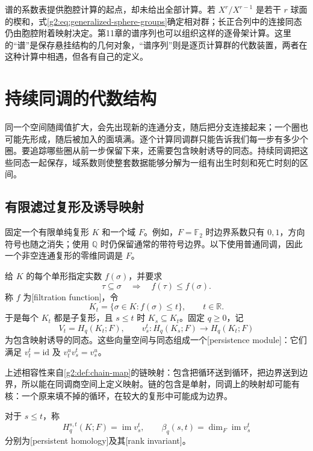 \ProseParagraphBreak

谱的系数表提供胞腔计算的起点，却未给出全部计算。若 \(X^r/X^{r-1}\) 是若干 \(r\) 球面的楔和，式\eqref{g2:eq:generalized-sphere-groups}确定相对群；长正合列中的连接同态仍由胞腔附着映射决定。第11章的谱序列也可以组织这样的逐骨架计算。这里的“谱”是保存悬挂结构的几何对象，“谱序列”则是逐页计算群的代数装置，两者在这种计算中相遇，但各有自己的定义。

\section{持续同调的代数结构}
\label{g2:sec:C03}

同一个空间随阈值扩大，会先出现新的连通分支，随后把分支连接起来；一个圈也可能先形成，随后被加入的面填满。逐个计算同调群只能告诉我们每一步有多少个圈。要追踪哪些圈从前一步保留下来，还需要包含映射诱导的同态。持续同调把这些同态一起保存，域系数则使整套数据能够分解为一组有出生时刻和死亡时刻的区间。

\subsection{有限滤过复形及诱导映射}
\label{g2:subsec:C03:01}

固定一个有限单纯复形 \(K\) 和一个域 \(F\)。例如，\(F=\mathbb F_2\) 时边界系数只有 \(0,1\)，方向符号也随之消失；使用 \(\mathbb Q\) 时仍保留通常的带符号边界。以下使用普通同调，因此一个非空连通复形的零维同调是 \(F\)。

\begin{definition}\label{g2:def:finite-filtration-persistence}
	给 \(K\) 的每个单形指定实数 \(f(\sigma)\)，并要求
	\[
		\tau\subseteq\sigma\quad\Longrightarrow\quad f(\tau)\leq f(\sigma).
	\]
	称 \(f\) 为[filtration function]，令
	\[
		K_t=\{\sigma\in K:f(\sigma)\leq t\},\qquad t\in\mathbb R.
	\]
	于是每个 \(K_t\) 都是子复形，且 \(s\leq t\) 时 \(K_s\subseteq K_t\)。固定 \(q\geq0\)，记
	\[
		V_t=H_q(K_t;F),\qquad v_s^t:H_q(K_s;F)\longrightarrow H_q(K_t;F)
	\]
	为包含映射诱导的同态。这些向量空间与同态组成一个[persistence module]：它们满足 \(v_t^t=\mathrm{id}\) 及 \(v_t^u v_s^t=v_s^u\)。
\end{definition}

上述相容性来自\cref{g2:def:chain-map}的链映射：包含把循环送到循环，把边界送到边界，所以能在同调商空间上定义映射。链的包含是单射，同调上的映射却可能有核：一个原来填不掉的循环，在较大的复形中可能成为边界。

\begin{definition}\label{g2:def:persistent-rank}
	对于 \(s\leq t\)，称
	\[
		H_q^{s,t}(K;F)=\operatorname{im}v_s^t,\qquad
		\beta_q(s,t)=\dim_F\operatorname{im}v_s^t
	\]
	分别为[persistent homology]及其[rank invariant]。
\end{definition}

